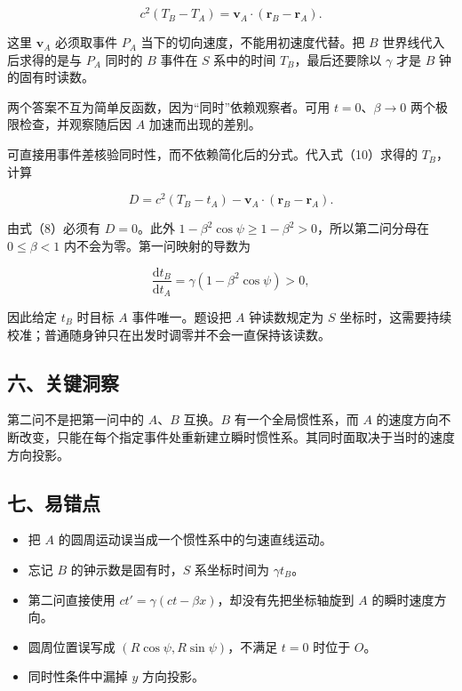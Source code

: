 \documentclass[12pt,a4paper,UTF8]{ctexart}
\newcommand{\tightlist}{\setlength{\itemsep}{0pt}\setlength{\parskip}{0pt}}
\begin{document}
\[c^2(T_B-T_A)=\boldsymbol v_A\cdot(\boldsymbol r_B-\boldsymbol r_A).\]

这里 \(\boldsymbol v_A\) 必须取事件 \(P_A\)
当下的切向速度，不能用初速度代替。把 \(B\) 世界线代入后求得的是与
\(P_A\) 同时的 \(B\) 事件在 \(S\) 系中的时间 \(T_B\)，最后还要除以
\(\gamma\) 才是 \(B\) 钟的固有时读数。

两个答案不互为简单反函数，因为``同时''依赖观察者。可用
\(t=0\)、\(\beta\to0\) 两个极限检查，并观察随后因 \(A\)
加速而出现的差别。

可直接用事件差核验同时性，而不依赖简化后的分式。代入式（10）求得的
\(T_B\)，计算

\[D=c^2(T_B-t_A)-\boldsymbol v_A\cdot(\boldsymbol r_B-\boldsymbol r_A).\]

由式（8）必须有 \(D=0\)。此外
\(1-\beta^2\cos\psi\ge1-\beta^2>0\)，所以第二问分母在 \(0\le\beta<1\)
内不会为零。第一问映射的导数为

\[\frac{\mathrm dt_B}{\mathrm dt_A}=\gamma(1-\beta^2\cos\psi)>0,\]

因此给定 \(t_B\) 时目标 \(A\) 事件唯一。题设把 \(A\) 钟读数规定为 \(S\)
坐标时，这需要持续校准；普通随身钟只在出发时调零并不会一直保持该读数。

\subsection{六、关键洞察}\label{ux516dux5173ux952eux6d1eux5bdf-6}

第二问不是把第一问中的 \(A\)、\(B\) 互换。\(B\) 有一个全局惯性系，而
\(A\)
的速度方向不断改变，只能在每个指定事件处重新建立瞬时惯性系。其同时面取决于当时的速度方向投影。

\subsection{七、易错点}\label{ux4e03ux6613ux9519ux70b9-6}

\begin{itemize}
\tightlist
\item
  把 \(A\) 的圆周运动误当成一个惯性系中的匀速直线运动。
\item
  忘记 \(B\) 的钟示数是固有时，\(S\) 系坐标时间为 \(\gamma t_B\)。
\item
  第二问直接使用 \(ct' =\gamma(ct-\beta x)\)，却没有先把坐标轴旋到 \(A\)
  的瞬时速度方向。
\item
  圆周位置误写成 \((R\cos\psi,R\sin\psi)\)，不满足 \(t=0\) 时位于
  \(O\)。
\item
  同时性条件中漏掉 \(y\) 方向投影。
\end{itemize}
\end{document}
